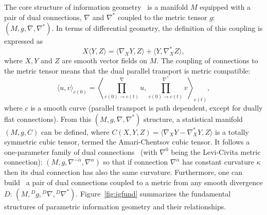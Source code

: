 \documentclass[graybox]{svmult}
\def\Inner#1#2{{\left\langle #1,#2\right\rangle}}
\def\inner#1#2{{\langle #1,#2\rangle}}
\begin{document}
The core structure of information geometry~\cite{IG-2016} is a manifold $M$ equipped with a pair of dual connections, $\nabla$ and $\nabla^*$ coupled to the metric tensor $g$: $(M,g,\nabla,\nabla^*)$. In terms of differential geometry, the definition of this coupling is expressed as
\begin{equation}
X\inner{Y}{Z} = \inner{\nabla_X Y}{Z} +  \inner{Y}{\nabla_X^* Z},
\end{equation}
where $X, Y$ and $Z$ are smooth vector fields on $M$.
The coupling of connections to the metric tensor means that the dual parallel transport is metric compatible:
\begin{equation}
\inner{u}{v}_{c(0)}  = \Inner{\prod_{c(0)\rightarrow c(t)}^\nabla u}{\prod_{c(0)\rightarrow c(t)}^{\nabla^*} v}_{c(t)},
\end{equation}
where $c$ is a smooth curve (parallel transport is path dependent, except for dually flat connections).
From this $(M,g,\nabla,\nabla^*)$ structure, a statistical manifold~\cite{Lauritzen-1987} $(M,g,C)$ can be defined, where 
$C(X,Y,Z)=\inner{\nabla_X Y-\nabla^*_X Y}{Z}$ is a totally symmetric cubic tensor, termed the Amari-Chentsov cubic tensor. 
It follows a one-parameter family of dual connections~\cite{IG-2016} (with $\nabla^0$ being the Levi-Civita metric connection): $(M,g,\nabla^{-\alpha},\nabla^\alpha)$ so that if connection $\nabla^\alpha$ has constant curvature $\kappa$ then its dual connection has also the same curvature.
Furthermore, one can build~\cite{Eguchi-1983,Eguchi-1992,IG-2016} a pair of dual connections coupled to a metric from any smooth divergence $D$: $(M,{}^Dg,{}^D\nabla,{}^D\nabla^*)$.
Figure~\ref{fig:igfund} summarizes the fundamental structures of parametric information geometry and their relationships.
\end{document}
